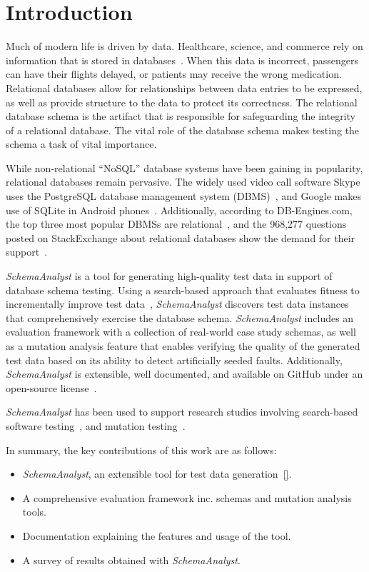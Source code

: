 \section{Introduction}\label{sec:intro}

Much of modern life is driven by data.  Healthcare, science, and commerce rely on information that is
stored in databases~\cite{kapfhammer2007comprehensive}.  When this data is incorrect, passengers can have
their flights delayed, or patients may receive the wrong medication. 
Relational databases allow for relationships between data entries to be expressed, as well as provide structure to 
the data to protect its correctness. The relational database schema is the artifact
that is responsible for safeguarding the integrity of a relational database. The vital role of the database
schema makes testing the schema a task of vital importance.

While non-relational ``NoSQL'' database systems have been gaining in popularity, relational databases remain
pervasive. The widely used video call software Skype uses the PostgreSQL database management system
(DBMS)~\cite{https://www.postgresql.org/about/users/},
and Google makes use of SQLite in Android phones~\cite{https://www.sqlite.org/famous.html}.
Additionally, according to DB-Engines.com, the top three most popular DBMSs are 
relational~\cite{http://db-engines.com/en/ranking}, and the 968,277 questions posted on StackExchange 
about relational databases show the demand for their support~\cite{http://goo.gl/F3Tiax}.

\textit{SchemaAnalyst} is a tool for generating high-quality test data in support of database schema
testing. Using a search-based approach that evaluates fitness to incrementally improve test data~\cite{Korel:AVM},
\textit{SchemaAnalyst} discovers test data instances that comprehensively exercise the database schema.
\textit{SchemaAnalyst} includes an evaluation framework
with a collection of real-world case study schemas, as well as a mutation analysis feature
that enables verifying the quality of the generated test data based on its ability to detect artificially
seeded faults. Additionally, \textit{SchemaAnalyst}
is extensible, well documented, and available on GitHub under an open-source license~\cite{tool}.

\textit{SchemaAnalyst} has been used to support research studies involving search-based
software testing~\cite{kapfhammer2013search,mcminn2015effectiveness,kinneer2015automatically}, and
mutation testing~\cite{wright2013efficient,wright2014impact,wright2015mutation}.

In summary, the key contributions of this work are as follows:

\begin{itemize}
	\item \textit{SchemaAnalyst}, an extensible tool for test data generation~\ref{}.
\item A comprehensive evaluation framework inc. schemas and mutation analysis tools.
\item Documentation explaining the features and usage of the tool.
\item A survey of results obtained with \textit{SchemaAnalyst}.
\end{itemize}
